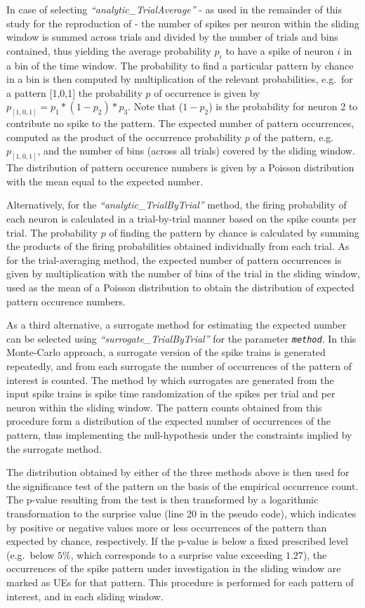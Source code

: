 \documentclass[10pt,a4paper,onecolumn]{article}
\begin{document}
In case of selecting \emph{``analytic\_TrialAverage''} - as used in the
remainder of this study for the reproduction of \autocite{Riehle97} -
the number of spikes per neuron within the sliding window is summed
across trials and divided by the number of trials and bins contained,
thus yielding the average probability \(p_{i}\) to have a spike of
neuron \(i\) in a bin of the time window. The probability to find a
particular pattern by chance in a bin is then computed by multiplication
of the relevant probabilities, e.g.~for a pattern {[}1,0,1{]} the
probability \(p\) of occurrence is given by
\(p_{[1,0,1]}=p_{1}*(1-p_{2})*p_{3}\). Note that (\(1-p_{2}\)) is the
probability for neuron 2 to contribute no spike to the pattern. The
expected number of pattern occurrences, computed as the product of the
occurrence probability \(p\) of the pattern, e.g. \(p_{[1,0,1]}\), and
the number of bins (across all trials) covered by the sliding window.
The distribution of pattern occurence numbers is given by a Poisson
distribution with the mean equal to the expected number.

Alternatively, for the \emph{``analytic\_TrialByTrial''} method, the
firing probability of each neuron is calculated in a trial-by-trial
manner based on the spike counts per trial. The probability \(p\) of
finding the pattern by chance is calculated by summing the products of
the firing probabilities obtained individually from each trial. As for
the trial-averaging method, the expected number of pattern occurrences
is given by multiplication with the number of bins of the trial in the
sliding window, used as the mean of a Poisson distribution to obtain the
distribution of expected pattern occurence numbers.

As a third alternative, a surrogate method for estimating the expected
number can be selected using \emph{``surrogate\_TrialByTrial''} for the
parameter \emph{\texttt{method}}. In this Monte-Carlo approach, a
surrogate version of the spike trains is generated repeatedly, and from
each surrogate the number of occurrences of the pattern of interest is
counted. The method by which surrogates are generated from the input
spike trains is spike time randomization of the spikes per trial and per
neuron within the sliding window. The pattern counts obtained from this
procedure form a distribution of the expected number of occurrences of
the pattern, thus implementing the null-hypothesis under the constraints
implied by the surrogate method.

The distribution obtained by either of the three methods above is then
used for the significance test of the pattern on the basis of the
empirical occurrence count. The p-value resulting from the test is then
transformed by a logarithmic transformation to the surprise value (line
20 in the pseudo code), which indicates by positive or negative values
more or less occurrences of the pattern than expected by chance,
respectively. If the p-value is below a fixed prescribed level
(e.g.~below \(5\%\), which corresponds to a surprise value exceeding
\(1.27\)), the occurrences of the spike pattern under investigation in
the sliding window are marked as UEs for that pattern. This procedure is
performed for each pattern of interest, and in each sliding window.
\end{document}

